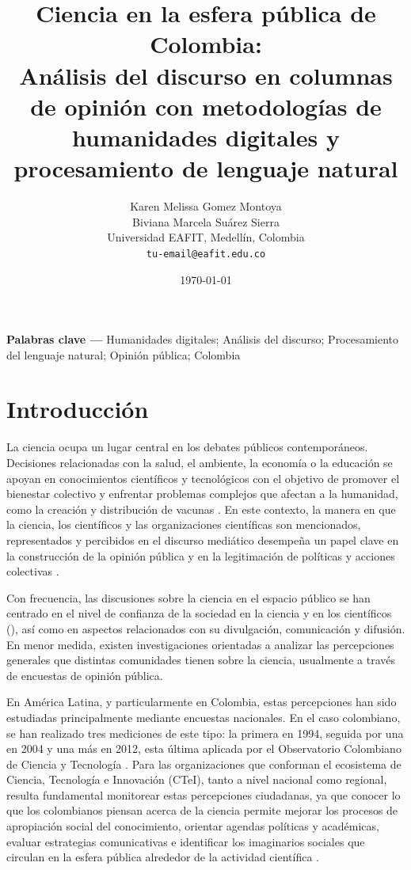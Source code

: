 \documentclass[11pt,a4paper]{article}
\title{Ciencia en la esfera pública de Colombia: \\
	Análisis del discurso en columnas de opinión con metodologías de humanidades digitales y procesamiento de lenguaje natural}
\author{
	Karen Melissa Gomez Montoya\\
	Biviana Marcela Suárez Sierra\\
	\small Universidad EAFIT, Medellín, Colombia\\
	\small \texttt{tu-email@eafit.edu.co}
}
\date{\today}
\newcommand{\keywords}[1]{\par\noindent\textbf{Palabras clave —} #1}
\newcommand{\JEL}[1]{\par\noindent\textbf{Clasificación —} #1}
\begin{document}
	\maketitle
	
	\begin{abstract}
		
	\end{abstract}
	
	\keywords{Humanidades digitales; Análisis del discurso; Procesamiento del lenguaje natural; Opinión pública; Colombia}
	

	\section{Introducción}
	
	La ciencia ocupa un lugar central en los debates públicos contemporáneos. Decisiones relacionadas con la salud, el ambiente, la economía o la educación se apoyan en conocimientos científicos y tecnológicos con el objetivo de promover el bienestar colectivo y enfrentar problemas complejos que afectan a la humanidad, como la creación y distribución de vacunas \cite{Chakravartty2022}. En este contexto, la manera en que la ciencia, los científicos y las organizaciones científicas son mencionados, representados y percibidos en el discurso mediático desempeña un papel clave en la construcción de la opinión pública y en la legitimación de políticas y acciones colectivas \cite{Mede2022}.
	
	Con frecuencia, las discusiones sobre la ciencia en el espacio público se han centrado en el nivel de confianza de la sociedad en la ciencia y en los científicos (\cite{Cologna2025, Sturgis2021, Mede2022}), así como en aspectos relacionados con su divulgación, comunicación y difusión. En menor medida, existen investigaciones orientadas a analizar las percepciones generales que distintas comunidades tienen sobre la ciencia, usualmente a través de encuestas de opinión pública.
	
	En América Latina, y particularmente en Colombia, estas percepciones han sido estudiadas principalmente mediante encuestas nacionales. En el caso colombiano, se han realizado tres mediciones de este tipo: la primera en 1994, seguida por una en 2004 y una más en 2012, esta última aplicada por el Observatorio Colombiano de Ciencia y Tecnología \cite{Daza_Caicedo2014}. Para las organizaciones que conforman el ecosistema de Ciencia, Tecnología e Innovación (CTeI), tanto a nivel nacional como regional, resulta fundamental monitorear estas percepciones ciudadanas, ya que conocer lo que los colombianos piensan acerca de la ciencia permite mejorar los procesos de apropiación social del conocimiento, orientar agendas políticas y académicas, evaluar estrategias comunicativas e identificar los imaginarios sociales que circulan en la esfera pública alrededor de la actividad científica \cite{Daza_Caicedo2014}.
	
\end{document}
